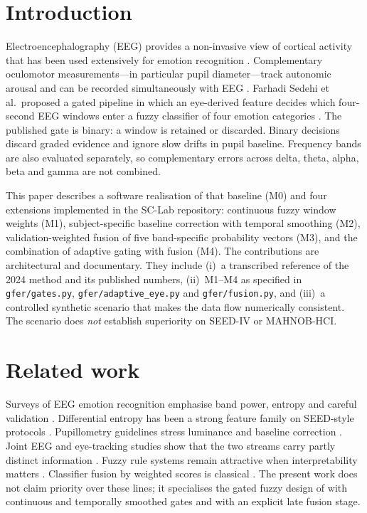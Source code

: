 \section{Introduction}
Electroencephalography (EEG) provides a non-invasive view of cortical activity that has been used extensively for emotion recognition \cite{Alarcao2019,Jenke2014}. Complementary oculomotor measurements---in particular pupil diameter---track autonomic arousal and can be recorded simultaneously with EEG \cite{Bradley2008,Partala2003,ZhengDong2014}. Farhadi Sedehi et al.\ proposed a gated pipeline in which an eye-derived feature decides which four-second EEG windows enter a fuzzy classifier of four emotion categories \cite{FarhadiSedehi2024a}. The published gate is binary: a window is retained or discarded. Binary decisions discard graded evidence and ignore slow drifts in pupil baseline. Frequency bands are also evaluated separately, so complementary errors across delta, theta, alpha, beta and gamma are not combined.

This paper describes a software realisation of that baseline (M0) and four extensions implemented in the SC-Lab repository: continuous fuzzy window weights (M1), subject-specific baseline correction with temporal smoothing (M2), validation-weighted fusion of five band-specific probability vectors (M3), and the combination of adaptive gating with fusion (M4). The contributions are architectural and documentary. They include (i)~a transcribed reference of the 2024 method and its published numbers, (ii)~M1--M4 as specified in \texttt{gfer/gates.py}, \texttt{gfer/adaptive\_eye.py} and \texttt{gfer/fusion.py}, and (iii)~a controlled synthetic scenario that makes the data flow numerically consistent. The scenario does \emph{not} establish superiority on SEED-IV or MAHNOB-HCI.

\section{Related work}
Surveys of EEG emotion recognition emphasise band power, entropy and careful validation \cite{Alarcao2019,Jenke2014,ZhengLu2015}. Differential entropy has been a strong feature family on SEED-style protocols \cite{Duan2013}. Pupillometry guidelines stress luminance and baseline correction \cite{Mathot2018,Kret2019}. Joint EEG and eye-tracking studies show that the two streams carry partly distinct information \cite{Lu2015,Zheng2019,Liu2022,Soleymani2012mm}. Fuzzy rule systems remain attractive when interpretability matters \cite{Zadeh1965,TakagiSugeno1985,WangMendel1992,Jang1993}. Classifier fusion by weighted scores is classical \cite{Kittler1998}. The present work does not claim priority over these lines; it specialises the gated fuzzy design of \cite{FarhadiSedehi2024a} with continuous and temporally smoothed gates and with an explicit late fusion stage.

